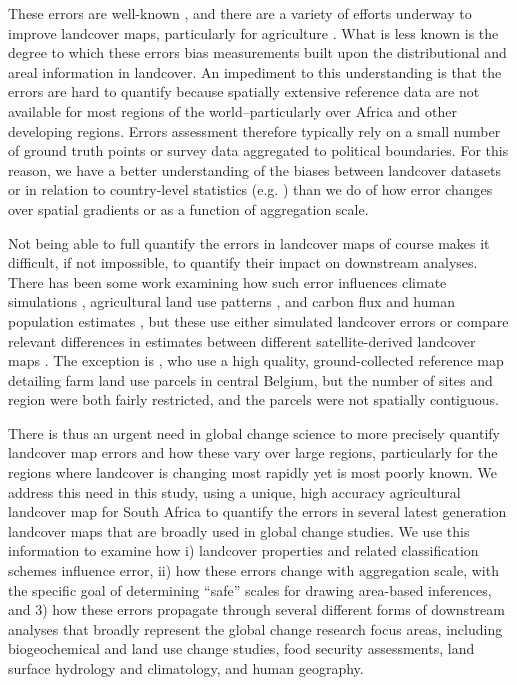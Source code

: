 \documentclass{pnastwo}
\begin{document}
\begin{article}
These errors are well-known \cite{fritz_comparison_2010, fritz_cropland_2011, see_improved_2015, fritz_mapping_2015,verburg_challenges_2011}, and there are a variety of efforts underway to improve landcover maps, particularly for agriculture \cite{fritz_geo-wiki:_2012,estes_diylandcover:_2015}. What is less known is the degree to which these errors bias measurements built upon the distributional and areal information in landcover. An impediment to this understanding is that the errors are hard to quantify because spatially extensive reference data are not available for most regions of the world--particularly over Africa and other developing regions. Errors assessment therefore typically rely on a small number of ground truth points or survey data aggregated to political boundaries. For this reason, we have a better understanding of the biases between landcover datasets or in relation to country-level statistics (e.g. \cite{fritz_comparison_2010,fritz_cropland_2011}) than we do of how error changes over spatial gradients or as a function of aggregation scale. 

Not being able to full quantify the errors in landcover maps of course makes it difficult, if not impossible, to quantify their impact on downstream analyses. There has been some work examining how such error influences climate simulations \cite{ge_impacts_2007}, agricultural land use patterns \cite{schmit_limitations_2006}, and carbon flux \cite{quaife_impact_2008} and human population estimates \cite{linard_assessing_2010}, but these use either simulated landcover errors \cite{ge_impacts_2007} or compare relevant differences in estimates between different satellite-derived landcover maps \cite{linard_assessing_2010, quaife_impact_2008}. The exception is \cite{schmit_limitations_2006}, who use a high quality, ground-collected reference map detailing farm land use parcels in central Belgium, but the number of sites and region were both fairly restricted, and the parcels were not spatially contiguous. 

There is thus an urgent need in global change science to more precisely quantify landcover map errors and how these vary over large regions, particularly for the regions where landcover is changing most rapidly yet is most poorly known.  We address this need in this study, using a unique, high accuracy agricultural landcover map for South Africa to quantify the errors in several latest generation landcover maps that are broadly used in global change studies.  We use this information to examine how i) landcover properties and related classification schemes influence error, ii) how these errors change with aggregation scale, with the specific goal of determining ``safe'' scales for drawing area-based inferences, and 3) how these errors propagate through several different forms of downstream analyses that broadly represent the global change research focus areas, including biogeochemical and land use change studies, food security assessments, land surface hydrology and climatology, and human geography.  


\end{article}
\end{document}

